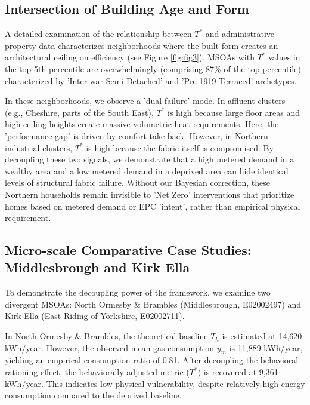 \documentclass[11pt, a4paper, twocolumn, numbers]{elsarticle}
\begin{document}
\subsection{Intersection of Building Age and Form}\label{intersection-of-building-age-and-form}

A detailed examination of the relationship between $T^*$ and administrative property data characterizes neighborhoods where the built form creates an architectural ceiling on efficiency (see Figure \ref{fig:fig3}).
 MSOAs with $T^*$ values in the top 5th percentile are overwhelmingly (comprising 87\% of the top percentile) characterized by 'Inter-war Semi-Detached' and 'Pre-1919 Terraced' archetypes. 

In these neighborhoods, we observe a 'dual failure' mode. In affluent clusters (e.g., Cheshire, parts of the South East), $T^*$ is high because large floor areas and high ceiling heights create massive volumetric heat requirements. Here, the 'performance gap' is driven by comfort take-back. However, in Northern industrial clusters, $T^*$ is high because the fabric itself is compromised. By decoupling these two signals, we demonstrate that a high metered demand in a wealthy area and a low metered demand in a deprived area can hide identical levels of structural fabric failure. Without our Bayesian correction, these Northern households remain invisible to 'Net Zero' interventions that prioritize homes based on metered demand or EPC 'intent', rather than empirical physical requirement.

\subsection{Micro-scale Comparative Case Studies: Middlesbrough and 
Kirk Ella}\label{micro-scale-comparative-case-studies}

To demonstrate the decoupling power of the framework, we examine two 
divergent MSOAs: North Ormesby \& Brambles (Middlesbrough, E02002497) and 
Kirk Ella (East Riding of Yorkshire, E02002711).

In North Ormesby \& Brambles, the theoretical baseline \(T_h\) is estimated at 14,620 kWh/year. However, the observed mean gas consumption \(y_m\) is 11,889 kWh/year, yielding an empirical consumption ratio of 0.81. After decoupling the behavioral rationing effect, the behaviorally-adjusted metric (\(T^*\)) is recovered at 9,361 kWh/year. This indicates low physical vulnerability, despite relatively high energy consumption compared to the deprived baseline.
\end{document}
